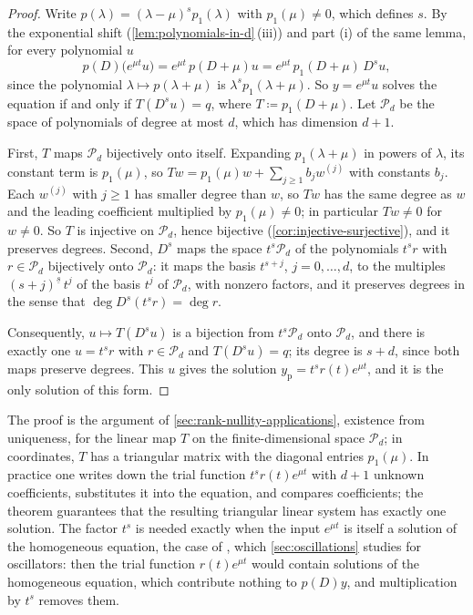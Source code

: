 \begin{proof}
Write $p(\lambda)=(\lambda-\mu)^sp_1(\lambda)$ with $p_1(\mu)\ne0$, which defines $s$. By the exponential shift (\cref{lem:polynomials-in-d}\,(iii)) and part (i) of the same lemma, for every polynomial $u$
\[
p(D)\bigl(e^{\mu t}u\bigr)=e^{\mu t}\,p(D+\mu)u=e^{\mu t}\,p_1(D+\mu)\,D^su ,
\]
since the polynomial $\lambda\mapsto p(\lambda+\mu)$ is $\lambda^sp_1(\lambda+\mu)$. So $y=e^{\mu t}u$ solves the equation if and only if $T(D^su)=q$, where $T\coloneqq p_1(D+\mu)$. Let $\mathcal P_d$ be the space of polynomials of degree at most $d$, which has dimension $d+1$.

First, $T$ maps $\mathcal P_d$ bijectively onto itself. Expanding $p_1(\lambda+\mu)$ in powers of $\lambda$, its constant term is $p_1(\mu)$, so $Tw=p_1(\mu)w+\sum_{j\ge1}b_jw^{(j)}$ with constants $b_j$. Each $w^{(j)}$ with $j\ge1$ has smaller degree than $w$, so $Tw$ has the same degree as $w$ and the leading coefficient multiplied by $p_1(\mu)\ne0$; in particular $Tw\ne0$ for $w\ne0$. So $T$ is injective on $\mathcal P_d$, hence bijective (\cref{cor:injective-surjective}), and it preserves degrees. Second, $D^s$ maps the space $t^s\mathcal P_d$ of the polynomials $t^sr$ with $r\in\mathcal P_d$ bijectively onto $\mathcal P_d$: it maps the basis $t^{s+j}$, $j=0,\ldots,d$, to the multiples $(s+j)^{\underline s}\,t^j$ of the basis $t^j$ of $\mathcal P_d$, with nonzero factors, and it preserves degrees in the sense that $\deg D^s(t^sr)=\deg r$.

Consequently, $u\mapsto T(D^su)$ is a bijection from $t^s\mathcal P_d$ onto $\mathcal P_d$, and there is exactly one $u=t^sr$ with $r\in\mathcal P_d$ and $T(D^su)=q$; its degree is $s+d$, since both maps preserve degrees. This $u$ gives the solution $y_{\mathrm p}=t^sr(t)e^{\mu t}$, and it is the only solution of this form.
\end{proof}

The proof is the argument of \cref{sec:rank-nullity-applications}, existence from uniqueness, for the linear map $T$ on the finite-dimensional space $\mathcal P_d$; in coordinates, $T$ has a triangular matrix with the diagonal entries $p_1(\mu)$. In practice one writes down the trial function $t^sr(t)e^{\mu t}$ with $d+1$ unknown coefficients, substitutes it into the equation, and compares coefficients; the theorem guarantees that the resulting triangular linear system has exactly one solution. The factor $t^s$ is needed exactly when the input $e^{\mu t}$ is itself a solution of the homogeneous equation, the case of , which \cref{sec:oscillations} studies for oscillators: then the trial function $r(t)e^{\mu t}$ would contain solutions of the homogeneous equation, which contribute nothing to $p(D)y$, and multiplication by $t^s$ removes them.

